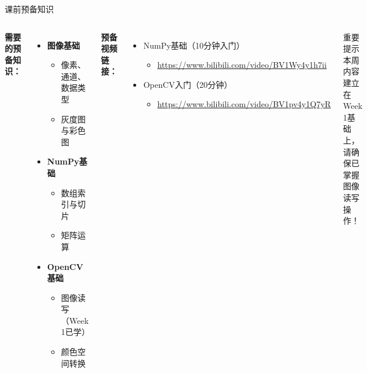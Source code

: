 \documentclass[aspectratio=169, 10pt]{beamer}
\institute{%
    \begin{minipage}{6cm}
        \centering
        \textbf{北京石油化工学院}\\
        \textit{人工智能研究院}
    \end{minipage}
}
\begin{document}
\begin{frame}
    \titlepage
\end{frame}

\begin{frame}{课前预备知识}
    \begin{columns}
        \textbf{需要的预备知识：}
        \begin{itemize}
            \item \textbf{图像基础}
            \begin{itemize}
                \item 像素、通道、数据类型
                \item 灰度图与彩色图
            \end{itemize}
            \item \textbf{NumPy基础}
            \begin{itemize}
                \item 数组索引与切片
                \item 矩阵运算
            \end{itemize}
            \item \textbf{OpenCV基础}
            \begin{itemize}
                \item 图像读写（Week 1已学）
                \item 颜色空间转换
            \end{itemize}
        \end{itemize}

        \textbf{预备视频链接：}
        \begin{itemize}
            \item NumPy基础（10分钟入门）
            \begin{itemize}
                \item \footnotesize \url{https://www.bilibili.com/video/BV1Wy4y1h7ii}
            \end{itemize}
            \item OpenCV入门（20分钟）
            \begin{itemize}
                \item \footnotesize \url{https://www.bilibili.com/video/BV1pv4y1Q7yR}
            \end{itemize}
        \end{itemize}

        \vspace{0.5cm}
        \begin{alertblock}{重要提示}
            本周内容建立在Week 1基础上，请确保已掌握图像读写操作！
        \end{alertblock}
    \end{columns}
\end{frame}
\end{document}
